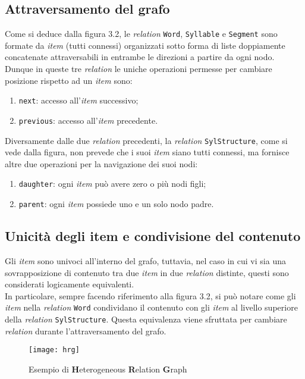 \subsection{Attraversamento del grafo}
Come si deduce dalla figura 3.2, le \textit{relation} \texttt{Word}, \texttt{Syllable} e \texttt{Segment} sono formate
da \textit{item} (tutti connessi) organizzati sotto forma di liste doppiamente concatenate attraversabili in entrambe le direzioni a partire da ogni nodo. \\
Dunque in queste tre \textit{relation} le uniche operazioni permesse per cambiare posizione rispetto ad un \textit{item} sono:
    \begin{enumerate}
      \item \texttt{next}: accesso all'\textit{item} successivo;
      \item \texttt{previous}: accesso all'\textit{item} precedente.
    \end{enumerate}
Diversamente dalle due \textit{relation} precedenti, la \textit{relation} \texttt{SylStructure}, come si vede dalla figura, 
non prevede che i suoi \textit{item} siano tutti connessi, ma fornisce altre due operazioni per la navigazione dei suoi nodi:
    \begin{enumerate}
      \item \texttt{daughter}: ogni \textit{item} può avere zero o più nodi figli;
      \item \texttt{parent}: ogni \textit{item} possiede uno e un solo nodo padre.
    \end{enumerate}

\subsection{Unicità degli item e condivisione del contenuto}
Gli \textit{item} sono univoci all'interno del grafo, tuttavia, nel caso in cui vi sia una sovrapposizione di contenuto tra 
due \textit{item} in due \textit{relation} distinte, questi sono considerati logicamente equivalenti. \\
In particolare, sempre facendo riferimento alla figura 3.2, si può notare come gli \textit{item} nella \textit{relation} \texttt{Word}
condividano il contenuto con gli \textit{item} al livello superiore della \textit{relation} \texttt{SylStructure}. Questa equivalenza
viene sfruttata per cambiare \textit{relation} durante l'attraversamento del grafo.

\begin{figure}[!h] 
    \centering 
    \texttt{[image: hrg]} 
    \caption{Esempio di \textbf{H}eterogeneous \textbf{R}elation \textbf{G}raph}
\end{figure}



